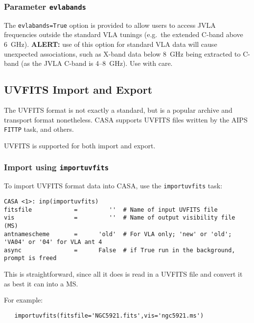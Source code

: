 \subsubsection{Parameter {\tt evlabands} }
\label{section:io.import.vla.evlabands}

The {\tt evlabands=True} option is provided to allow users to access
JVLA frequencies outside the standard VLA tunings (e.g.\ the extended
C-band above 6~GHz).  {\bf ALERT:} use of this option for standard VLA
data will cause unexpected associations, such as X-band data below
8~GHz being extracted to C-band (as the JVLA C-band is 4--8~GHz).  Use
with care.

\subsection{UVFITS Import and Export}
\label{section:io.import.uvfits}

The UVFITS format is not exactly a standard, but is a popular
archive and transport format nonetheless.  CASA supports 
UVFITS files written by the AIPS {\tt FITTP} task, and others.

UVFITS is supported for both import and export.




\subsubsection{Import using {\tt importuvfits} }
\label{section:io.import.uvfits.import}

To import UVFITS format data into CASA, use the {\tt importuvfits} task: 
\small
\begin{verbatim}
CASA <1>: inp(importuvfits)
fitsfile            =         ''  # Name of input UVFITS file
vis                 =         ''  # Name of output visibility file (MS)
antnamescheme       =      'old'  # For VLA only; 'new' or 'old'; 'VA04' or '04' for VLA ant 4
async               =      False  # if True run in the background, prompt is freed
\end{verbatim}
\normalsize
This is straightforward, since all it does is read in a UVFITS file and
convert it as best it can into a MS.

For example:
\small
\begin{verbatim}
   importuvfits(fitsfile='NGC5921.fits',vis='ngc5921.ms')
\end{verbatim}
\normalsize

